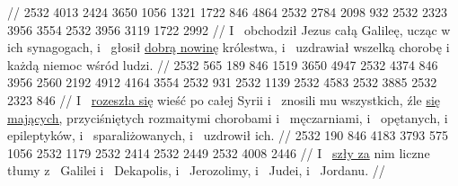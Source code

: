 //
\endgl
\begingl
\gla
{} 2532 4013 2424 3650 1056 1321 1722 846 4864 2532 2784 2098 932 2532 2323 3956 3554 2532 3956 3119 1722 2992
//
\glb
{} I~ obchodził Jezus całą Galileę, ucząc w~ ich synagogach, i~ głosił \underline{dobrą nowinę} królestwa, i~ uzdrawiał wszelką chorobę i~ każdą niemoc wśród ludzi.
//
\endgl
\begingl
\gla
{} 2532 565 189 846 1519 3650 4947 2532 4374 846 3956 2560 2192 4912 4164 3554 2532 931 2532 1139 2532 4583 2532 3885 2532 2323 846
//
\glb
{} I~ \underline{rozeszła się} wieść  po całej Syrii i~ znosili mu wszystkich, źle \underline{się mających,} przyciśniętych rozmaitymi chorobami i~ męczarniami, i~ opętanych, i~ epileptyków, i~ sparaliżowanych, i~ uzdrowił ich.
//
\endgl
\begingl
\gla
{} 2532 190 846 4183 3793 575 1056 2532 1179 2532 2414 2532 2449 2532 4008 2446
//
\glb
{} I~ \underline{szły za} nim liczne tłumy z~ Galilei i~ Dekapolis, i~ Jerozolimy, i~ Judei, i~  Jordanu.
//
\endgl
